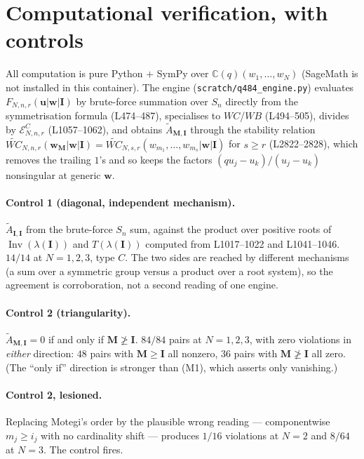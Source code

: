 \documentclass[11pt]{article}
\theoremstyle{plain}
\theoremstyle{definition}
\theoremstyle{remark}
\newcommand{\Inv}{\operatorname{Inv}}
\newcommand{\bI}{\mathbf{I}}
\newcommand{\bM}{\mathbf{M}}
\newcommand{\bu}{\mathbf{u}}
\newcommand{\bw}{\mathbf{w}}
\newcommand{\WCt}{\widetilde{WC}}
\begin{document}
\section{Computational verification, with controls}
\label{sec:verif}

All computation is pure Python $+$ SymPy over
$\mathbb C(q)(w_1,\dots,w_N)$ (SageMath is not installed in this container).  The
engine (\texttt{scratch/q484\_engine.py}) evaluates $F_{N,n,r}(\bu|\bw|\bI)$ by
brute-force summation over $S_n$ directly from the symmetrisation formula
(L474--487), specialises to $WC$/$WB$ (L494--505), divides by
$\mathcal E^C_{N,n,r}$ (L1057--1062), and obtains
$\widetilde A_{\bM,\bI}$ through the stability relation
$\WCt_{N,n,r}(\bw_{\bM}|\bw|\bI)=\WCt_{N,s,r}(w_{m_1},\dots,w_{m_s}|\bw|\bI)$
for $s\ge r$ (L2822--2828), which removes the trailing $1$'s and so keeps the
factors $(qu_j-u_k)/(u_j-u_k)$ nonsingular at generic $\bw$.

\paragraph{Control 1 (diagonal, independent mechanism).}
$\widetilde A_{\bI,\bI}$ from the brute-force $S_n$ sum, against the product over
positive roots of $\Inv(\lambda(\bI))$ and $T(\lambda(\bI))$ computed from
L1017--1022 and L1041--1046.  \textbf{$14/14$} at $N=1,2,3$, type $C$.  The two
sides are reached by different mechanisms (a sum over a symmetric group versus a
product over a root system), so the agreement is corroboration, not a second
reading of one engine.

\paragraph{Control 2 (triangularity).}
$\widetilde A_{\bM,\bI}=0$ if and only if $\bM\not\ge\bI$.
\textbf{$84/84$} pairs at $N=1,2,3$, with zero violations in \emph{either}
direction: $48$ pairs with $\bM\ge\bI$ all nonzero, $36$ pairs with
$\bM\not\ge\bI$ all zero.  (The ``only if'' direction is stronger than (M1),
which asserts only vanishing.)

\paragraph{Control 2, lesioned.}
Replacing Motegi's order by the plausible wrong reading --- componentwise
$m_j\ge i_j$ with no cardinality shift --- produces $1/16$ violations at $N=2$
and $8/64$ at $N=3$.  The control fires.
\end{document}
